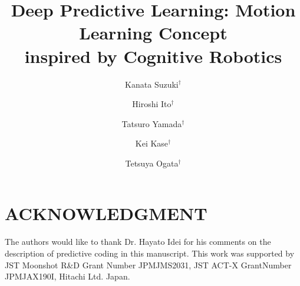 \documentclass[a4paper,twocolumn]{article}
\title{\LARGE \bf Deep Predictive Learning: Motion Learning Concept\\
\LARGE \bf inspired by Cognitive Robotics}
\author{%
Kanata Suzuki$^{\dagger}$\first\second
\and
\hspace{6mm}
\and
Hiroshi Ito$^{\dagger}$\first\third
\and
\hspace{6mm}
\and
Tatsuro Yamada$^{\dagger}$\first\fourth
\and
\hspace{6mm}
\and
Kei Kase$^{\dagger}$\first
\and
\hspace{6mm}
\and
Tetsuya Ogata$^{\dagger}$\first
}
\begin{document}
\maketitle







\section*{ACKNOWLEDGMENT}
The authors would like to thank Dr. Hayato Idei for his comments on the description of predictive coding in this manuscript.
This work was supported by JST Moonshot R\&D Grant Number JPMJMS2031, JST ACT-X GrantNumber JPMJAX190I, Hitachi Ltd. Japan.



\end{document}
